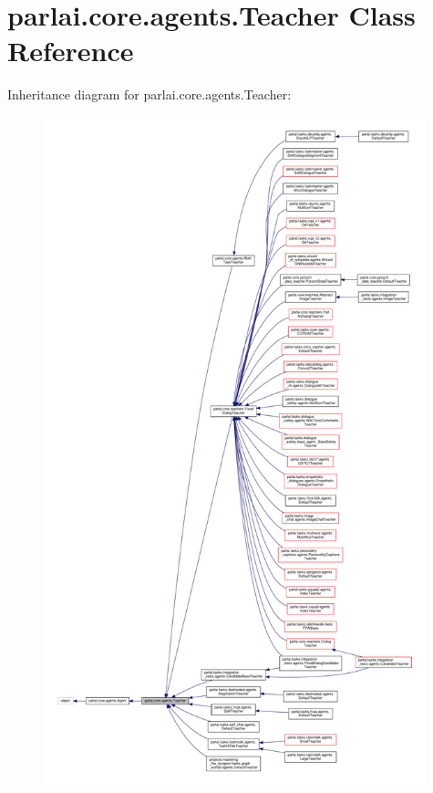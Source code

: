 \hypertarget{classparlai_1_1core_1_1agents_1_1Teacher}{}\section{parlai.\+core.\+agents.\+Teacher Class Reference}
\label{classparlai_1_1core_1_1agents_1_1Teacher}


Inheritance diagram for parlai.\+core.\+agents.\+Teacher\+:
\nopagebreak
\begin{figure}[H]
\begin{center}
\leavevmode
\includegraphics[height=550pt]{d6/d93/classparlai_1_1core_1_1agents_1_1Teacher__inherit__graph}
\end{center}
\end{figure}


